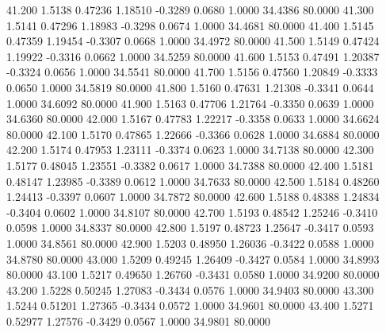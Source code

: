   41.200   1.5138   0.47236   1.18510  -0.3289   0.0680   1.0000  34.4386  80.0000
  41.300   1.5141   0.47296   1.18983  -0.3298   0.0674   1.0000  34.4681  80.0000
  41.400   1.5145   0.47359   1.19454  -0.3307   0.0668   1.0000  34.4972  80.0000
  41.500   1.5149   0.47424   1.19922  -0.3316   0.0662   1.0000  34.5259  80.0000
  41.600   1.5153   0.47491   1.20387  -0.3324   0.0656   1.0000  34.5541  80.0000
  41.700   1.5156   0.47560   1.20849  -0.3333   0.0650   1.0000  34.5819  80.0000
  41.800   1.5160   0.47631   1.21308  -0.3341   0.0644   1.0000  34.6092  80.0000
  41.900   1.5163   0.47706   1.21764  -0.3350   0.0639   1.0000  34.6360  80.0000
  42.000   1.5167   0.47783   1.22217  -0.3358   0.0633   1.0000  34.6624  80.0000
  42.100   1.5170   0.47865   1.22666  -0.3366   0.0628   1.0000  34.6884  80.0000
  42.200   1.5174   0.47953   1.23111  -0.3374   0.0623   1.0000  34.7138  80.0000
  42.300   1.5177   0.48045   1.23551  -0.3382   0.0617   1.0000  34.7388  80.0000
  42.400   1.5181   0.48147   1.23985  -0.3389   0.0612   1.0000  34.7633  80.0000
  42.500   1.5184   0.48260   1.24413  -0.3397   0.0607   1.0000  34.7872  80.0000
  42.600   1.5188   0.48388   1.24834  -0.3404   0.0602   1.0000  34.8107  80.0000
  42.700   1.5193   0.48542   1.25246  -0.3410   0.0598   1.0000  34.8337  80.0000
  42.800   1.5197   0.48723   1.25647  -0.3417   0.0593   1.0000  34.8561  80.0000
  42.900   1.5203   0.48950   1.26036  -0.3422   0.0588   1.0000  34.8780  80.0000
  43.000   1.5209   0.49245   1.26409  -0.3427   0.0584   1.0000  34.8993  80.0000
  43.100   1.5217   0.49650   1.26760  -0.3431   0.0580   1.0000  34.9200  80.0000
  43.200   1.5228   0.50245   1.27083  -0.3434   0.0576   1.0000  34.9403  80.0000
  43.300   1.5244   0.51201   1.27365  -0.3434   0.0572   1.0000  34.9601  80.0000
  43.400   1.5271   0.52977   1.27576  -0.3429   0.0567   1.0000  34.9801  80.0000
